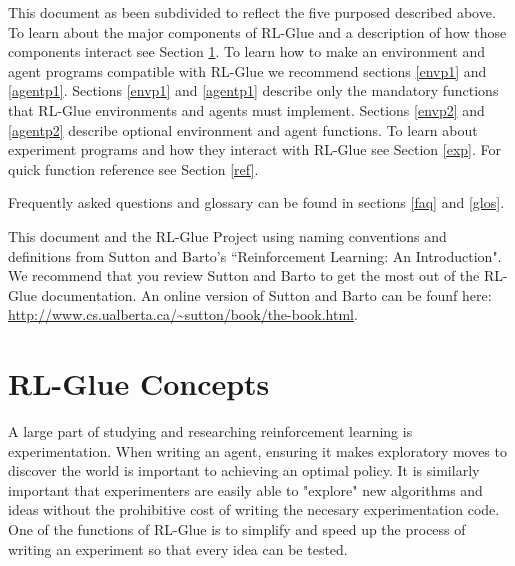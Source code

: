 \documentclass[11pt]{article}
\begin{document}
This document as been subdivided to reflect the five purposed described above. To learn about the major components of RL-Glue and a description of how those components interact see Section \ref{RL-Glue}. To learn how to make an environment and agent programs compatible with RL-Glue we recommend sections \ref{envp1} and \ref{agentp1}. Sections \ref{envp1} and \ref{agentp1} describe only the mandatory functions that RL-Glue environments and agents must implement. Sections \ref{envp2} and \ref{agentp2} describe optional environment and agent functions. To learn about experiment programs and how they interact with RL-Glue see Section \ref{exp}. For quick function reference see Section \ref{ref}.

Frequently asked questions and glossary can be found in sections \ref{faq} and \ref{glos}.

This document and the RL-Glue Project using naming conventions and definitions from Sutton and Barto's ``Reinforcement Learning: An Introduction". We recommend that you review Sutton and Barto to get the most out of the RL-Glue documentation. An online version of Sutton and Barto can be founf here: \url{http://www.cs.ualberta.ca/~sutton/book/the-book.html}.



 
 
\section{RL-Glue Concepts}
\label{RL-Glue}
A large part of studying and researching reinforcement learning is experimentation. When writing an agent, ensuring it makes exploratory moves to discover the world is important to achieving an optimal policy. It is similarly important that experimenters are easily able to "explore" new algorithms and ideas without the prohibitive cost of writing the necesary experimentation code. One of the functions of RL-Glue is to simplify and speed up the process of writing an experiment so that every idea can be tested. 
\end{document}
